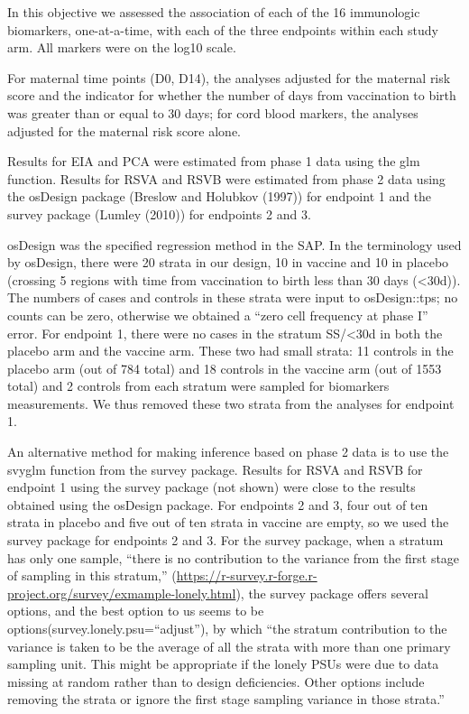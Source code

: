 \documentclass[11pt]{article}
\begin{document}
In this objective we assessed the association of each of the 16 immunologic biomarkers, one-at-a-time, with each of the three endpoints within each study arm. All markers were on the log10 scale.

For maternal time points (D0, D14), the analyses adjusted for the maternal risk score and the indicator for whether the number of days from vaccination to birth was greater than or equal to 30 days; for cord blood markers, the analyses adjusted for the maternal risk score alone.

Results for EIA and PCA were estimated from phase 1 data using the glm function.
Results for RSVA and RSVB were estimated from phase 2 data using the osDesign package (Breslow and Holubkov (1997)) for endpoint 1 and the survey package (Lumley (2010)) for endpoints 2 and 3.
\bigskip

osDesign was the specified regression method in the SAP. In the terminology used by osDesign, there were 20 strata in our design, 10 in vaccine and 10 in placebo (crossing 5 regions with time from vaccination to birth less than 30 days (\textless30d)). The numbers of cases and controls in these strata were input to osDesign::tps; no counts can be zero, otherwise we obtained a ``zero cell frequency at phase I'' error. For endpoint 1, there were no cases in the stratum SS/\textless30d in both the placebo arm and the vaccine arm. These two had small strata: 11 controls in the placebo arm (out of 784 total) and 18 controls in the vaccine arm (out of 1553 total) and 2 controls from each stratum were sampled for biomarkers measurements. We thus removed these two strata from the analyses for endpoint 1.
\bigskip

An alternative method for making inference based on phase 2 data is to use the svyglm function from the survey package. Results for RSVA and RSVB for endpoint 1 using the survey package (not shown) were close to the results obtained using the osDesign package. For endpoints 2 and 3, four out of ten strata in placebo and five out of ten strata in vaccine are empty, so we used the survey package for endpoints 2 and 3. For the survey package, when a stratum has only one sample, ``there is no contribution to the variance from the first stage of sampling in this stratum,'' (\url{https://r-survey.r-forge.r-project.org/survey/exmample-lonely.html}), the survey package offers several options, and the best option to us seems to be options(survey.lonely.psu=``adjust''), by which ``the stratum contribution to the variance is taken to be the average of all the strata with more than one primary sampling unit. This might be appropriate if the lonely PSUs were due to data missing at random rather than to design deficiencies. Other options include removing the strata or ignore the first stage sampling variance in those strata.''
\bigskip
\end{document}
